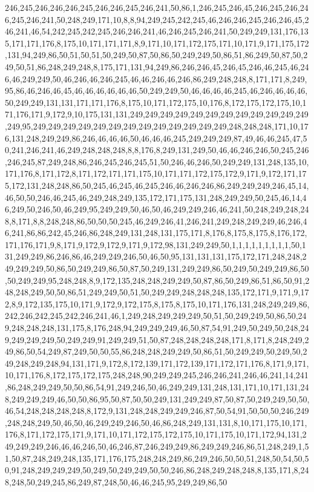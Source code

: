 246,245,246,246,246,245,246,246,245,246,241,50,86,1,246,245,246,45,246,245,246,246,245,246,241,50,248,249,171,10,8,8,94,249,245,242,245,46,246,246,245,246,246,45,246,241,46,54,242,245,242,245,246,246,241,46,246,245,246,241,50,249,249,131,176,135,171,171,176,8,175,10,171,171,171,8,9,171,10,171,172,175,171,10,171,9,171,175,172,131,94,249,86,50,51,50,51,50,249,50,87,50,86,50,249,249,50,86,51,86,249,50,87,50,249,50,51,86,248,249,248,8,175,171,131,94,249,86,246,246,45,246,45,246,46,245,46,246,46,249,249,50,46,246,46,246,245,46,46,246,46,246,86,249,248,248,8,171,171,8,249,95,86,46,246,46,45,46,46,46,46,46,46,50,249,249,50,46,46,46,46,245,46,246,46,46,46,50,249,249,131,131,171,171,176,8,175,10,171,172,175,10,176,8,172,175,172,175,10,171,176,171,9,172,9,10,175,131,131,249,249,249,249,249,249,249,249,249,249,249,249,249,95,249,249,249,249,249,249,249,249,249,249,249,249,249,248,248,248,171,10,176,131,248,249,249,86,246,46,46,46,50,46,46,46,245,249,249,249,87,49,46,46,245,47,50,241,246,241,46,249,248,248,248,8,8,176,8,249,131,249,50,46,46,246,246,50,245,246,246,245,87,249,248,86,246,245,246,245,51,50,246,46,246,50,249,249,131,248,135,10,171,176,8,171,172,8,171,172,171,171,175,10,171,171,172,175,172,9,171,9,172,171,175,172,131,248,248,86,50,245,46,245,46,245,246,46,246,246,86,249,249,249,246,45,14,46,50,50,246,46,245,46,249,248,249,135,172,171,175,131,248,249,249,50,245,46,14,46,249,50,246,50,46,249,95,249,249,50,46,50,46,249,249,246,46,241,50,248,249,248,248,8,171,8,8,248,248,86,50,50,50,245,46,249,246,41,246,241,249,248,249,249,46,246,46,241,86,86,242,45,246,86,248,249,131,248,131,175,171,8,176,8,175,8,175,8,176,172,171,176,171,9,8,171,9,172,9,172,9,171,9,172,98,131,249,249,50,1,1,1,1,1,1,1,1,1,50,131,249,249,86,246,86,46,249,249,246,50,46,50,95,131,131,131,175,172,171,248,248,249,249,249,50,86,50,249,249,86,50,87,50,249,131,249,249,86,50,249,50,249,249,86,50,50,249,249,95,248,248,8,9,172,135,248,248,249,249,50,87,86,50,249,86,51,86,50,91,248,248,249,50,50,86,51,249,249,50,51,50,249,249,248,248,248,135,172,171,9,171,9,172,8,9,172,135,175,10,171,9,172,9,172,175,8,175,8,175,10,171,176,131,248,249,249,86,242,246,242,245,242,246,241,46,1,249,248,249,249,249,50,51,50,249,249,50,86,50,249,248,248,248,131,175,8,176,248,94,249,249,249,46,50,87,54,91,249,50,249,50,248,249,249,249,249,50,249,249,91,249,249,51,50,87,248,248,248,248,171,8,171,8,248,249,249,86,50,54,249,87,249,50,50,55,86,248,248,249,249,50,86,51,50,249,249,50,249,50,249,248,249,248,94,131,171,9,172,8,172,139,171,172,139,171,172,171,176,8,171,9,171,10,171,176,8,172,175,172,175,248,248,90,249,249,245,246,246,241,246,46,241,14,241,86,248,249,249,50,50,86,54,91,249,246,50,46,249,249,131,248,131,171,10,171,131,248,249,249,249,46,50,50,86,95,50,87,50,50,249,131,249,249,87,50,87,50,249,249,50,50,46,54,248,248,248,248,8,172,9,131,248,248,249,249,246,87,50,54,91,50,50,50,246,249,248,248,249,50,46,50,46,249,249,246,50,46,86,248,249,131,131,8,10,171,175,10,171,176,8,171,172,175,171,9,171,10,171,172,175,172,175,10,171,175,10,171,172,94,131,249,249,249,246,46,46,246,50,46,246,87,246,249,249,86,249,249,246,86,51,248,249,1,51,50,87,248,249,248,135,171,176,175,248,248,249,86,249,246,50,50,51,248,50,54,50,50,91,248,249,249,249,50,249,50,249,249,50,50,246,86,248,249,248,248,8,135,171,8,248,248,50,249,245,86,249,87,248,50,46,46,245,95,249,249,86,50